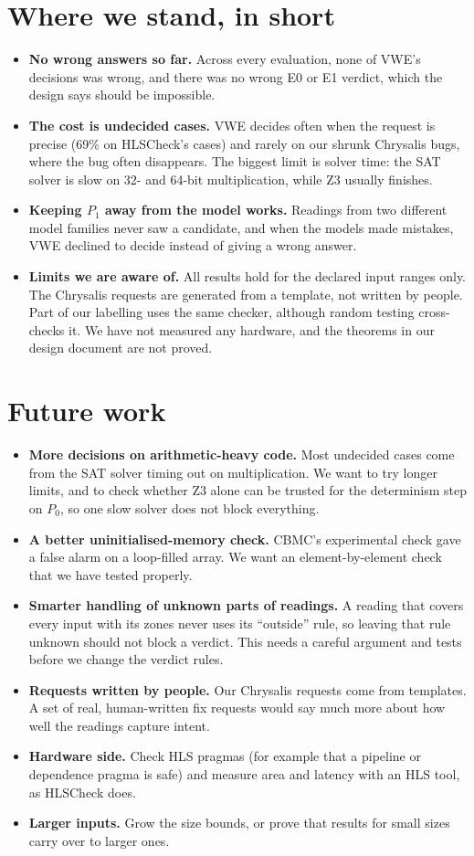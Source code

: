 \documentclass[10pt,a4paper]{article}
\newcommand{\Pz}{P_0}\newcommand{\Po}{P_1}
\begin{document}
\section{Where we stand, in short}
\begin{itemize}
\item \textbf{No wrong answers so far.} Across every evaluation, none of VWE's decisions was
wrong, and there was no wrong E0 or E1 verdict, which the design says should be impossible.
\item \textbf{The cost is undecided cases.} VWE decides often when the request is precise (69\% on
HLSCheck's cases) and rarely on our shrunk Chrysalis bugs, where the bug often disappears. The biggest
limit is solver time: the SAT solver is slow on 32- and 64-bit multiplication, while Z3 usually
finishes.
\item \textbf{Keeping $\Po$ away from the model works.} Readings from two different model families
never saw a candidate, and when the models made mistakes, VWE declined to decide instead of giving
a wrong answer.
\item \textbf{Limits we are aware of.} All results hold for the declared input ranges only. The
Chrysalis requests are generated from a template, not written by people. Part of our labelling
uses the same checker, although random testing cross-checks it. We have not measured any hardware,
and the theorems in our design document are not proved.
\end{itemize}

\section{Future work}
\begin{itemize}
\item \textbf{More decisions on arithmetic-heavy code.} Most undecided cases come from the SAT
solver timing out on multiplication. We want to try longer limits, and to check whether Z3 alone
can be trusted for the determinism step on $\Pz$, so one slow solver does not block everything.
\item \textbf{A better uninitialised-memory check.} CBMC's experimental check gave a false alarm on
a loop-filled array. We want an element-by-element check that we have tested properly.
\item \textbf{Smarter handling of unknown parts of readings.} A reading that covers every input
with its zones never uses its ``outside'' rule, so leaving that rule unknown should not block a
verdict. This needs a careful argument and tests before we change the verdict rules.
\item \textbf{Requests written by people.} Our Chrysalis requests come from templates. A set of
real, human-written fix requests would say much more about how well the readings capture intent.
\item \textbf{Hardware side.} Check HLS pragmas (for example that a pipeline or dependence pragma is
safe) and measure area and latency with an HLS tool, as HLSCheck does.
\item \textbf{Larger inputs.} Grow the size bounds, or prove that results for small sizes carry over
to larger ones.
\end{itemize}
\end{document}
